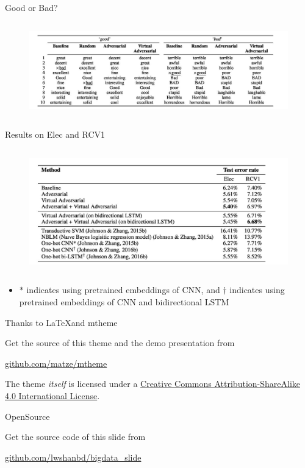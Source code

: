 \begin{frame}{Good or Bad?}
	\begin{columns}[onlytextwidth]
		
		\begin{figure}
			\includegraphics[width=1\linewidth]{goodbad.jpg}
		\end{figure}
	\end{columns}
\end{frame}

\begin{frame}{Results on Elec and RCV1}
	\begin{columns}[onlytextwidth]
		
		\column{1\textwidth}
		\begin{figure}
			\includegraphics[width=1\linewidth]{elec.jpg}
		\end{figure}
	\end{columns}
\begin{itemize}
	\item $*$ indicates using pretrained embeddings of CNN, and $\dag$ indicates using pretrained embeddings of CNN and bidirectional LSTM
	\end{itemize}
\end{frame}

\begin{frame}{Thanks to \LaTeX\quad and mtheme}
	
	Get the source of this theme and the demo presentation from
	
	\begin{center}\url{github.com/matze/mtheme}\end{center}
	
	The theme \emph{itself} is licensed under a
	\href{http://creativecommons.org/licenses/by-sa/4.0/}{Creative Commons
		Attribution-ShareAlike 4.0 International License}.
	
	\begin{center}\ccbysa\end{center}
	
\end{frame}

\begin{frame}{OpenSource}
	
	Get the source code of this slide from
	
	\begin{center}\url{github.com/lwshanbd/bigdata_slide}\end{center}
	

	
\end{frame}